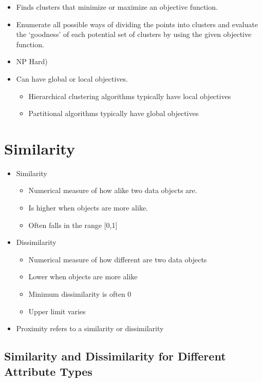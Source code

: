 \begin{itemize}
\begin{itemize}
		      \item Finds clusters that minimize or maximize an objective
		            function.
		      \item Enumerate all possible ways of dividing the points into
		            clusters and evaluate the `goodness' of each potential
		            set of clusters by using the given objective function.
		      \item NP Hard)
		      \item Can have global or local objectives.
		            \begin{itemize}
			            \item Hierarchical clustering algorithms typically have local objectives
			            \item Partitional algorithms typically have global objectives
		            \end{itemize}
	      \end{itemize}
\end{itemize}

\newpage
\section{Similarity}
\begin{itemize}
    \item Similarity
          \begin{itemize}
              \item Numerical measure of how alike two data objects are.
              \item Is higher when objects are more alike.
              \item Often falls in the range [0,1]
          \end{itemize}
    \item Dissimilarity
          \begin{itemize}
              \item Numerical measure of how different are two data objects
              \item Lower when objects are more alike
              \item Minimum dissimilarity is often 0
              \item Upper limit varies
          \end{itemize}
    \item Proximity refers to a similarity or dissimilarity
\end{itemize}

\subsection{Similarity and Dissimilarity for Different Attribute Types}

